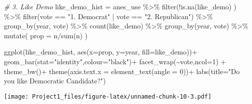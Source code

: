 \documentclass[
]{article}
\newenvironment{Shaded}{\begin{snugshade}}{\end{snugshade}}
\newcommand{\AttributeTok}[1]{\textcolor[rgb]{0.77,0.63,0.00}{#1}}
\newcommand{\CommentTok}[1]{\textcolor[rgb]{0.56,0.35,0.01}{\textit{#1}}}
\newcommand{\DecValTok}[1]{\textcolor[rgb]{0.00,0.00,0.81}{#1}}
\newcommand{\FunctionTok}[1]{\textcolor[rgb]{0.00,0.00,0.00}{#1}}
\newcommand{\NormalTok}[1]{#1}
\newcommand{\OtherTok}[1]{\textcolor[rgb]{0.56,0.35,0.01}{#1}}
\newcommand{\SpecialCharTok}[1]{\textcolor[rgb]{0.00,0.00,0.00}{#1}}
\newcommand{\StringTok}[1]{\textcolor[rgb]{0.31,0.60,0.02}{#1}}
\begin{document}
\begin{Shaded}
\begin{Highlighting}[]
\CommentTok{\# 3. Like Demo }
\NormalTok{like\_demo\_hist }\OtherTok{=}\NormalTok{ anes\_use }\SpecialCharTok{\%\textgreater{}\%}
  \FunctionTok{filter}\NormalTok{(}\SpecialCharTok{!}\FunctionTok{is.na}\NormalTok{(like\_demo) ) }\SpecialCharTok{\%\textgreater{}\%}
  \FunctionTok{filter}\NormalTok{(vote }\SpecialCharTok{==} \StringTok{"1. Democrat"} \SpecialCharTok{|}\NormalTok{ vote }\SpecialCharTok{==} \StringTok{"2. Republican"}\NormalTok{) }\SpecialCharTok{\%\textgreater{}\%}
  \FunctionTok{group\_by}\NormalTok{(year, vote) }\SpecialCharTok{\%\textgreater{}\%}
  \FunctionTok{count}\NormalTok{(like\_demo) }\SpecialCharTok{\%\textgreater{}\%}
  \FunctionTok{group\_by}\NormalTok{(year, vote) }\SpecialCharTok{\%\textgreater{}\%}
  \FunctionTok{mutate}\NormalTok{(}
    \AttributeTok{prop =}\NormalTok{ n}\SpecialCharTok{/}\FunctionTok{sum}\NormalTok{(n)}
\NormalTok{  )}

\FunctionTok{ggplot}\NormalTok{(like\_demo\_hist,}
       \FunctionTok{aes}\NormalTok{(}\AttributeTok{x=}\NormalTok{prop, }\AttributeTok{y=}\NormalTok{year, }\AttributeTok{fill=}\NormalTok{like\_demo))}\SpecialCharTok{+}
  \FunctionTok{geom\_bar}\NormalTok{(}\AttributeTok{stat=}\StringTok{"identity"}\NormalTok{,}\AttributeTok{colour=}\StringTok{"black"}\NormalTok{)}\SpecialCharTok{+}
  \FunctionTok{facet\_wrap}\NormalTok{(}\SpecialCharTok{\textasciitilde{}}\NormalTok{vote,}\AttributeTok{ncol=}\DecValTok{1}\NormalTok{) }\SpecialCharTok{+}
  \FunctionTok{theme\_bw}\NormalTok{()}\SpecialCharTok{+}
  \FunctionTok{theme}\NormalTok{(}\AttributeTok{axis.text.x =} \FunctionTok{element\_text}\NormalTok{(}\AttributeTok{angle =} \DecValTok{0}\NormalTok{))}\SpecialCharTok{+}
  \FunctionTok{labs}\NormalTok{(}\AttributeTok{title=}\StringTok{"Do you like Democratic Candidate?"}\NormalTok{)}
\end{Highlighting}
\end{Shaded}

\texttt{[image: Project1\_files/figure-latex/unnamed-chunk-10-3.pdf]}
\end{document}
